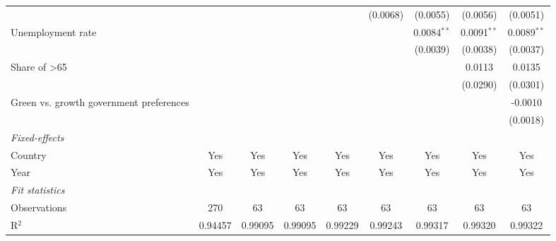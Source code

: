 \begin{table}[htbp]
\begin{tabular}{lcccccccc}
                                                                                        &          &          &          &              & (0.0068)      & (0.0055)      & (0.0056)      & (0.0051)\\   
      Unemployment rate                                                                 &          &          &          &              &               & 0.0084$^{**}$ & 0.0091$^{**}$ & 0.0089$^{**}$\\   
                                                                                        &          &          &          &              &               & (0.0039)      & (0.0038)      & (0.0037)\\   
      Share of >65                                                                      &          &          &          &              &               &               & 0.0113        & 0.0135\\   
                                                                                        &          &          &          &              &               &               & (0.0290)      & (0.0301)\\   
      Green vs. growth government preferences                                           &          &          &          &              &               &               &               & -0.0010\\   
                                                                                        &          &          &          &              &               &               &               & (0.0018)\\   
      \midrule
      \emph{Fixed-effects}\\
      Country                                                                           & Yes      & Yes      & Yes      & Yes          & Yes           & Yes           & Yes           & Yes\\  
      Year                                                                              & Yes      & Yes      & Yes      & Yes          & Yes           & Yes           & Yes           & Yes\\  
      \midrule
      \emph{Fit statistics}\\
      Observations                                                                      & 270      & 63       & 63       & 63           & 63            & 63            & 63            & 63\\  
      R$^2$                                                                             & 0.94457  & 0.99095  & 0.99095  & 0.99229      & 0.99243       & 0.99317       & 0.99320       & 0.99322\\  

\end{tabular}
\end{table}

